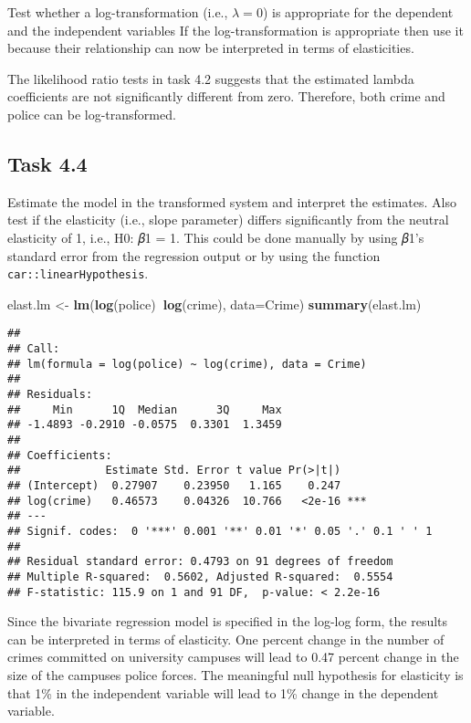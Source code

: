 \documentclass[
]{article}
\newenvironment{Shaded}{\begin{snugshade}}{\end{snugshade}}
\newcommand{\DataTypeTok}[1]{\textcolor[rgb]{0.13,0.29,0.53}{#1}}
\newcommand{\KeywordTok}[1]{\textcolor[rgb]{0.13,0.29,0.53}{\textbf{#1}}}
\newcommand{\NormalTok}[1]{#1}
\newcommand{\OperatorTok}[1]{\textcolor[rgb]{0.81,0.36,0.00}{\textbf{#1}}}
\newcommand{\StringTok}[1]{\textcolor[rgb]{0.31,0.60,0.02}{#1}}
\begin{document}
Test whether a log-transformation (i.e., \(\lambda = 0\)) is appropriate
for the dependent and the independent variables If the
log-transformation is appropriate then use it because their relationship
can now be interpreted in terms of elasticities.

The likelihood ratio tests in task 4.2 suggests that the estimated
lambda coefficients are not significantly different from zero.
Therefore, both crime and police can be log-transformed.

\hypertarget{task-4.4}{%
\subsection{Task 4.4}\label{task-4.4}}

Estimate the model in the transformed system and interpret the
estimates. Also test if the elasticity (i.e., slope parameter) differs
significantly from the neutral elasticity of 1, i.e., H0: 𝛽1 = 1. This
could be done manually by using 𝛽1's standard error from the regression
output or by using the function \texttt{car::linearHypothesis}.

\begin{Shaded}
\begin{Highlighting}[]
\NormalTok{elast.lm <-}\StringTok{ }\KeywordTok{lm}\NormalTok{(}\KeywordTok{log}\NormalTok{(police)}\OperatorTok{~}\KeywordTok{log}\NormalTok{(crime), }\DataTypeTok{data=}\NormalTok{Crime)}
\KeywordTok{summary}\NormalTok{(elast.lm)}
\end{Highlighting}
\end{Shaded}

\begin{verbatim}
## 
## Call:
## lm(formula = log(police) ~ log(crime), data = Crime)
## 
## Residuals:
##     Min      1Q  Median      3Q     Max 
## -1.4893 -0.2910 -0.0575  0.3301  1.3459 
## 
## Coefficients:
##             Estimate Std. Error t value Pr(>|t|)    
## (Intercept)  0.27907    0.23950   1.165    0.247    
## log(crime)   0.46573    0.04326  10.766   <2e-16 ***
## ---
## Signif. codes:  0 '***' 0.001 '**' 0.01 '*' 0.05 '.' 0.1 ' ' 1
## 
## Residual standard error: 0.4793 on 91 degrees of freedom
## Multiple R-squared:  0.5602, Adjusted R-squared:  0.5554 
## F-statistic: 115.9 on 1 and 91 DF,  p-value: < 2.2e-16
\end{verbatim}

Since the bivariate regression model is specified in the log-log form,
the results can be interpreted in terms of elasticity. One percent
change in the number of crimes committed on university campuses will
lead to 0.47 percent change in the size of the campuses police forces.
The meaningful null hypothesis for elasticity is that 1\% in the
independent variable will lead to 1\% change in the dependent variable.
\end{document}
